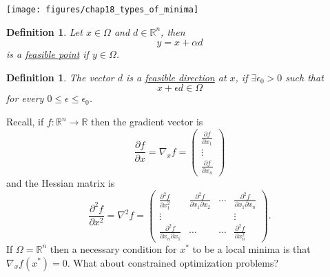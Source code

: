 \documentclass{article}
\newtheorem{definition}[theorem]{Definition}
\begin{document}
	\begin{center}
		\texttt{[image: figures/chap18\_types\_of\_minima]}
	\end{center}

	\begin{definition}
		Let $x \in \Omega$ and $d \in \mathbb{R}^n$, then 
		\[
			y = x+ \alpha d
		\]
		is a \underline{feasible point} if $y \in \Omega$.
	\end{definition}
	
	
	\begin{definition}
		The vector $d$ is a \underline{feasible direction} at $x$, if $\exists\epsilon_0 > 0$ such that 
		\[
			x + \epsilon d \in \Omega
		\]		
		for every $0 \leq \epsilon \leq \epsilon_0$.
	\end{definition}

	Recall, if $f: \mathbb{R}^n\to\mathbb{R}$ then the gradient vector is
	\[
		\frac{\partial f}{\partial x} 
			= \nabla_x f 
			= \begin{pmatrix}
	    		\frac{\partial f}{\partial x_1}\\
	    		\vdots\\
	    		\frac{\partial f}{\partial x_n}
	  		  \end{pmatrix}
	\]
	and the Hessian matrix is
	\[ 
		\frac{\partial^2 f}{\partial x^2} 
			= \nabla^2f 
			= \begin{pmatrix}
	    		\frac{\partial^2 f}{\partial x_1^2} & \frac{\partial^2 f}{\partial x_1 \partial x_2} & \cdots & \frac{\partial^2 f}{\partial x_1 \partial x_n}\\
	    		\vdots & & & \vdots\\
	    		\frac{\partial^2 f}{\partial x_n \partial x_1} & \cdots & \cdots & \frac{\partial^2 f}{\partial x_n^2}
	  		  \end{pmatrix}.
	\]	
	If $\Omega = \mathbb{R}^n$ then a necessary condition for $x^{\ast}$ to be a local minima is that $\nabla_xf(x^{\ast})=0$.  What about constrained optimization problems?
\end{document}
